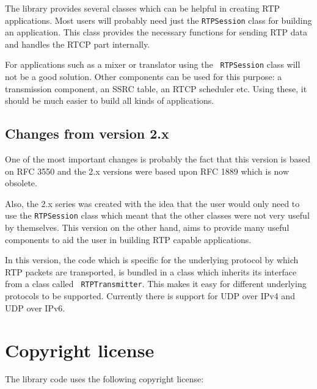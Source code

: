 \documentclass[12pt,a4paper]{article}
\begin{document}
			The library provides several classes which can be helpful in
			creating RTP applications. Most users will probably need just the
			{\tt RTPSession} class for building an application. This class
			provides the necessary functions for sending RTP data and handles
			the RTCP part internally.

			For applications such as a mixer or translator using the {\tt
			RTPSession} class will not be a good solution. Other components can
			be used for this purpose: a transmission component, an SSRC table,
			an RTCP scheduler etc. Using these, it should be much easier to
			build all kinds of applications.

		\subsection{Changes from version 2.x}

			One of the most important changes is probably the fact that this
			version is based on RFC 3550 and the 2.x versions were based upon
			RFC 1889 which is now obsolete.

			Also, the 2.x series was created with the idea that the user would
			only need to use the {\tt RTPSession} class which meant that the
			other classes were not very useful by themselves. This version on
			the other hand, aims to provide many useful components to aid the
			user in building RTP capable applications.

			In this version, the code which is specific for the underlying
			protocol by which RTP packets are transported, is bundled in
			a class which inherits its interface from a class called {\tt
			RTPTransmitter}. This makes it easy for different underlying
			protocols to be supported. Currently there is support for UDP over
			IPv4 and UDP over IPv6.

	\section{Copyright license}

		The library code uses the following copyright license:
\end{document}
